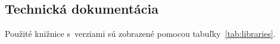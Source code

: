 \documentclass[a4paper,twoside,slovak,12pt,appendix]{article}
\begin{document}

\newpage\null\thispagestyle{empty}\newpage
{}




\begin{appendices}
\newpage
{}

\section{Technická dokumentácia}
Použité knižnice s~verziami sú zobrazené pomocou tabuľky~\ref{tab:libraries}.


\end{appendices}
\end{document}
